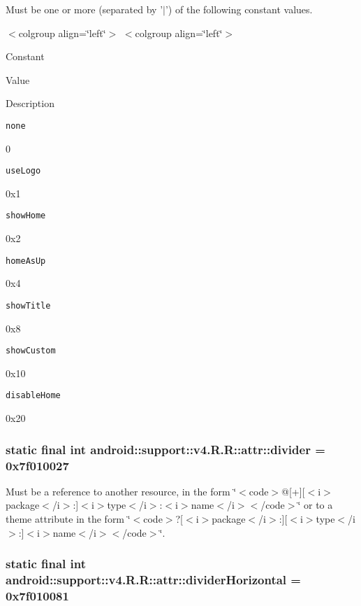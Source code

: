 Must be one or more (separated by '$|$') of the following constant values. \begin{TabularC}{0}
\hline
\end{TabularC}
$<$colgroup align=\char`\"{}left\char`\"{}$>$ $<$colgroup align=\char`\"{}left\char`\"{}$>$ 

Constant

Value

Description 

{\tt none}

0

{\tt useLogo}

0x1

{\tt showHome}

0x2

{\tt homeAsUp}

0x4

{\tt showTitle}

0x8

{\tt showCustom}

0x10

{\tt disableHome}

0x20\hypertarget{classandroid_1_1support_1_1v4_1_1_r_1_1attr_5ce40ae40da07c6053d46d2cd9740133}{
\subsubsection[{divider}]{\setlength{\rightskip}{0pt plus 5cm}static final int android::support::v4.R.R::attr::divider = 0x7f010027}}
\label{classandroid_1_1support_1_1v4_1_1_r_1_1attr_5ce40ae40da07c6053d46d2cd9740133}


Must be a reference to another resource, in the form \char`\"{}$<$code$>$@\mbox{[}+\mbox{]}\mbox{[}$<$i$>$package$<$/i$>$:\mbox{]}$<$i$>$type$<$/i$>$:$<$i$>$name$<$/i$>$$<$/code$>$\char`\"{} or to a theme attribute in the form \char`\"{}$<$code$>$?\mbox{[}$<$i$>$package$<$/i$>$:\mbox{]}\mbox{[}$<$i$>$type$<$/i$>$:\mbox{]}$<$i$>$name$<$/i$>$$<$/code$>$\char`\"{}. \hypertarget{classandroid_1_1support_1_1v4_1_1_r_1_1attr_5a89c625aa8e02027c813453f5f27e54}{
\subsubsection[{dividerHorizontal}]{\setlength{\rightskip}{0pt plus 5cm}static final int android::support::v4.R.R::attr::dividerHorizontal = 0x7f010081}}
\label{classandroid_1_1support_1_1v4_1_1_r_1_1attr_5a89c625aa8e02027c813453f5f27e54}


